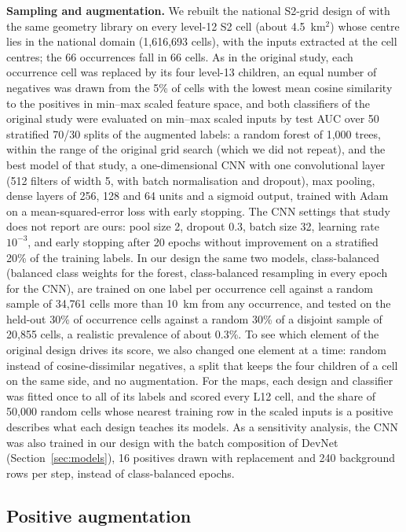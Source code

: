 \documentclass[pdflatex,sn-apa]{sn-jnl}
\begin{document}
\textbf{Sampling and augmentation.} We rebuilt the national S2-grid design of \citet{Parsa2024} with the same geometry library on every level-12 S2 cell (about 4.5~km$^2$) whose centre lies in the national domain (1,616,693 cells), with the inputs extracted at the cell centres; the 66 occurrences fall in 66 cells. As in the original study, each occurrence cell was replaced by its four level-13 children, an equal number of negatives was drawn from the 5\% of cells with the lowest mean cosine similarity to the positives in min--max scaled feature space, and both classifiers of the original study were evaluated on min--max scaled inputs by test AUC over 50 stratified 70/30 splits of the augmented labels: a random forest of 1,000 trees, within the range of the original grid search (which we did not repeat), and the best model of that study, a one-dimensional CNN with one convolutional layer (512 filters of width 5, with batch normalisation and dropout), max pooling, dense layers of 256, 128 and 64 units and a sigmoid output, trained with Adam on a mean-squared-error loss with early stopping. The CNN settings that study does not report are ours: pool size 2, dropout 0.3, batch size 32, learning rate $10^{-3}$, and early stopping after 20 epochs without improvement on a stratified 20\% of the training labels. In our design the same two models, class-balanced (balanced class weights for the forest, class-balanced resampling in every epoch for the CNN), are trained on one label per occurrence cell against a random sample of 34,761 cells more than 10~km from any occurrence, and tested on the held-out 30\% of occurrence cells against a random 30\% of a disjoint sample of 20,855 cells, a realistic prevalence of about 0.3\%. To see which element of the original design drives its score, we also changed one element at a time: random instead of cosine-dissimilar negatives, a split that keeps the four children of a cell on the same side, and no augmentation. For the maps, each design and classifier was fitted once to all of its labels and scored every L12 cell, and the share of 50,000 random cells whose nearest training row in the scaled inputs is a positive describes what each design teaches its models. As a sensitivity analysis, the CNN was also trained in our design with the batch composition of DevNet (Section~\ref{sec:models}), 16 positives drawn with replacement and 240 background rows per step, instead of class-balanced epochs.


\subsection{Positive augmentation}\label{sec:augmentation}
\end{document}
